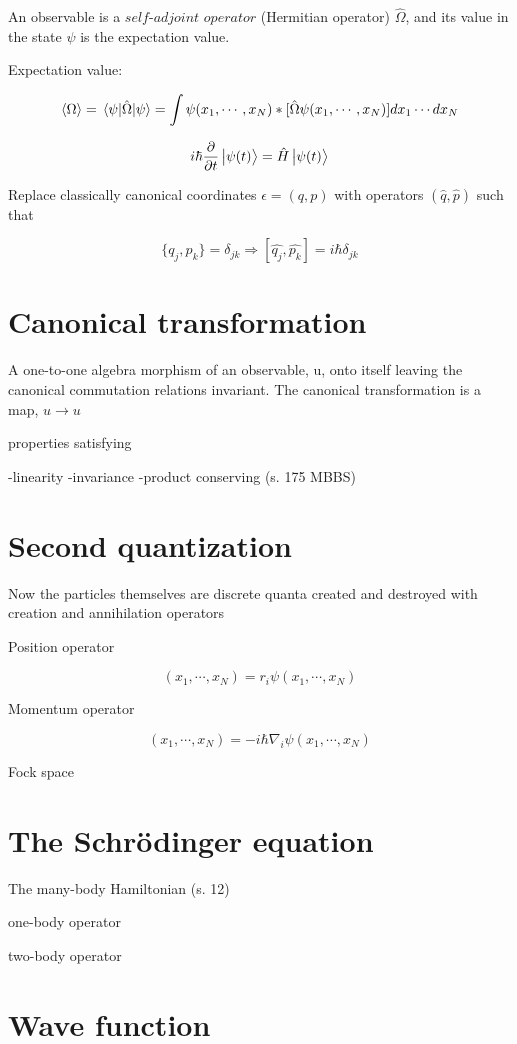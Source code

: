 An observable is a $\textit{self-adjoint operator}$ (Hermitian operator) $\hat{\Omega}$, and its value in the state $\psi$ is the expectation value. 

Expectation value: 

\begin{equation}
\expval{\Omega} = \expval{\hat{\Omega}}{\psi} = \int \psi (x_1, \cdots , x_N)\ast [\hat{\Omega} \psi (x_1, \cdots, x_N)] dx_1 \cdots dx_N
\end{equation}

\begin{equation}
i \hbar \frac{\partial}{\partial t} \ket{\psi(t)} = \hat{H} \ket{\psi(t)}
\end{equation}

Replace classically canonical coordinates $\epsilon = (q, p)$ with operators $(\hat{q}, \hat{p})$ such that

\begin{equation}
\{q_j, p_k\} = \delta_{jk} \Rightarrow [\hat{q_j}, \hat{p_k}] = i \hbar \delta_{jk}
\end{equation}

\section{Canonical transformation}

A one-to-one algebra morphism of an observable, u, onto itself leaving the canonical commutation relations invariant. The canonical transformation is a map, $u \rightarrow u$ 

properties satisfying 

-linearity
-invariance
-product conserving (s. 175 MBBS)

\section{Second quantization}

Now the particles themselves are discrete quanta created and destroyed with creation and annihilation operators

Position operator 

\begin{equation}
[\hat{r_i} \psi](x_1, \cdots, x_N) = r_i \psi (x_1, \cdots, x_N) 
\end{equation}

Momentum operator 

\begin{equation}
[\hat{p_i} \psi](x_1, \cdots, x_N) = -i \hbar \nabla_i \psi (x_1, \cdots, x_N) 
\end{equation}

Fock space

\section{The Schrödinger equation}

The many-body Hamiltonian (s. 12) 

one-body operator  

two-body operator

\section{Wave function}